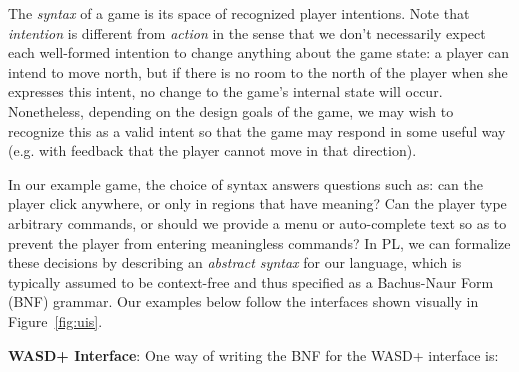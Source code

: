 % 
% 
%   

  The {\em syntax} of a game is its space of recognized player intentions.
  Note that {\em intention} is different from {\em action} in the sense
  that we don't necessarily expect each well-formed intention to change
  anything about the game state: a player can intend to move north, but if
  there is no room to the north of the player when she expresses this
  intent, no change to the game's internal state will occur. Nonetheless,
  depending on the design goals of the game, we may wish to recognize this
  as a valid intent so that the game may respond in some useful way (e.g.
  with feedback that the player cannot move in that direction).
  
  In our example game, the choice of syntax answers questions such as: can
  the player click anywhere, or only in regions that have meaning? Can the
  player type arbitrary commands, or should we provide a menu or
  auto-complete text so as to prevent the player from entering meaningless
  commands?  In PL, we can formalize these decisions by describing an {\em
  abstract syntax} for our language, which is typically assumed to be
  context-free and thus specified as a Bachus-Naur Form (BNF) grammar. Our
  examples below follow the interfaces shown visually in
  Figure~\ref{fig:uis}.
  
  \textbf{WASD+ Interface}:
  One way of writing the BNF for the WASD+ interface is:

